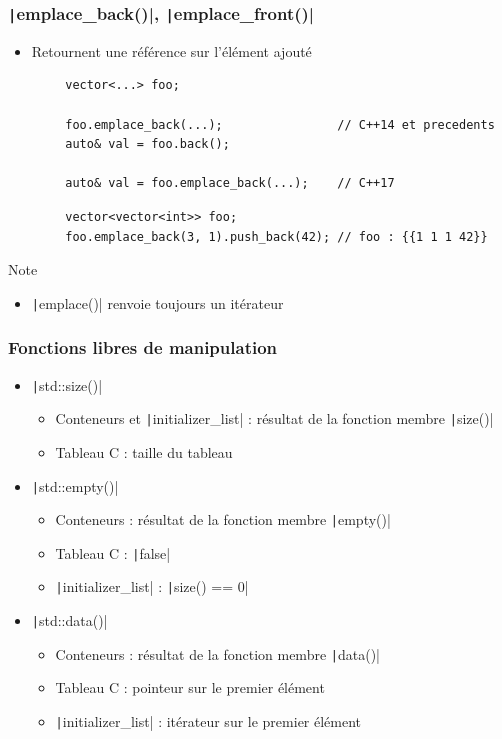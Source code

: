\documentclass[C++.tex]{subfiles}
\begin{document}
\begin{frame}[fragile]
	\frametitle{\texttt|emplace_back()|, \texttt|emplace_front()|}
	\begin{itemize}
		\item Retournent une référence sur l'élément ajouté
	\end{itemize}

	\begin{verbatim}
		vector<...> foo;

		foo.emplace_back(...);                // C++14 et precedents
		auto& val = foo.back();

		auto& val = foo.emplace_back(...);    // C++17
	\end{verbatim}

	\begin{verbatim}
		vector<vector<int>> foo;
		foo.emplace_back(3, 1).push_back(42); // foo : {{1 1 1 42}}
	\end{verbatim}

	\begin{block}{Note}
	\begin{itemize}
		\item \texttt|emplace()| renvoie toujours un itérateur
	\end{itemize}
	\end{block}
\end{frame}

\begin{frame}[fragile]
	\frametitle{Fonctions libres de manipulation}
	\begin{itemize}
		\item \texttt|std::size()|
		\begin{itemize}
			\item Conteneurs et \texttt|initializer_list| : résultat de la fonction membre \texttt|size()|
			\item Tableau C : taille du tableau
		\end{itemize} 

		\item \texttt|std::empty()|
		\begin{itemize}
			\item Conteneurs : résultat de la fonction membre \texttt|empty()|
			\item Tableau C : \texttt|false|
			\item \texttt|initializer_list| : \texttt|size() == 0|
		\end{itemize}

		\item \texttt|std::data()|
		\begin{itemize}
			\item Conteneurs : résultat de la fonction membre \texttt|data()|
			\item Tableau C : pointeur sur le premier élément
			\item \texttt|initializer_list| : itérateur sur le premier élément
		\end{itemize}
	\end{itemize}	
\end{frame}
\end{document}
